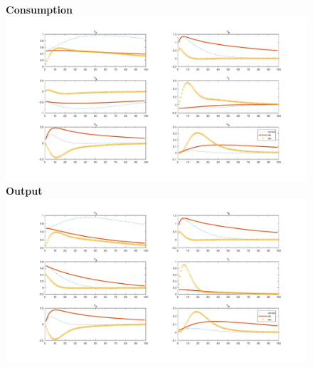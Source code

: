 \documentclass[12pt,reqno]{article}
\numberwithin{equation}{section}
\begin{document}
\begin{figure}[H]
\textbf{Consumption}\\
\includegraphics[scale=0.4]{AR1_impresp_cons.pdf}\\
\textbf{Output}\\
\includegraphics[scale=0.4]{AR1_impresp_output.pdf}\\
\end{figure}
\end{document}

